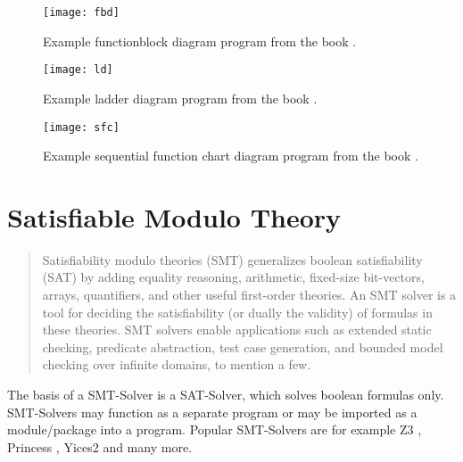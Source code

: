 \begin{figure}
	\centering
	\texttt{[image: fbd]}
	\caption{Example functionblock diagram program from the book \cite{johnIEC611313Programming2010}.}
	\label{code:fbd}
\end{figure}

\begin{figure}
	\centering
	\texttt{[image: ld]}
	\caption{Example ladder diagram program from the book \cite{johnIEC611313Programming2010}.}
	\label{code:ld}
\end{figure}

\begin{figure}
	\centering
	\texttt{[image: sfc]}
	\caption{Example sequential function chart diagram program from the book \cite{johnIEC611313Programming2010}.}
	\label{code:sfc}
\end{figure}

\section{Satisfiable Modulo Theory}
\begin{quote}
	Satisfiability modulo theories (SMT) generalizes boolean satisfiability (SAT) by
	adding equality reasoning, arithmetic, fixed-size bit-vectors, arrays, quantifiers,
	and other useful first-order theories. An SMT solver is a tool for deciding the satisfiability (or dually the validity) of formulas in these theories. SMT solvers enable
	applications such as extended static checking, predicate abstraction, test case generation, and bounded model checking over infinite domains, to mention a few. \cite{demouraZ3EfficientSMT2008}
\end{quote}

The basis of a SMT-Solver is a SAT-Solver, which solves boolean formulas only. SMT-Solvers may function as a separate program or may be imported as a module/package into a program. 
Popular SMT-Solvers are for example Z3 \cite{demouraZ3EfficientSMT2008}, Princess \cite{princess08}, Yices2 \cite{Dutertre:cav2014} and many more.

